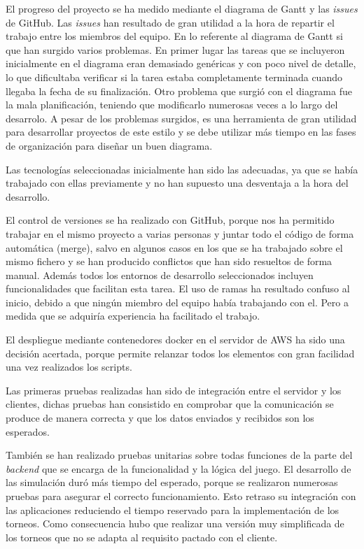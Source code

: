 \documentclass{article}
\begin{document}
El progreso del proyecto se ha medido mediante el diagrama de Gantt y las \textit{issues} de GitHub. Las \textit{issues} han resultado de gran utilidad a la hora de repartir el trabajo entre los miembros del equipo. En lo referente al diagrama de Gantt si que han surgido varios problemas. En primer lugar las tareas que se incluyeron inicialmente en el diagrama eran demasiado genéricas y con poco nivel de detalle, lo que dificultaba verificar si la tarea estaba completamente terminada cuando llegaba la fecha de su finalización. Otro problema que surgió con el diagrama fue la mala planificación, teniendo que modificarlo numerosas veces a lo largo del desarrolo. A pesar de los problemas surgidos, es una herramienta de gran utilidad para desarrollar proyectos de este estilo y se debe utilizar más tiempo en las fases de organización para diseñar un buen diagrama.

Las tecnologías seleccionadas inicialmente han sido las adecuadas, ya que se había trabajado con ellas previamente y no han supuesto una desventaja a la hora del desarrollo.

El control de versiones se ha realizado con GitHub, porque nos ha permitido trabajar en el mismo proyecto a varias personas y juntar todo el código de forma automática (merge), salvo en algunos casos en los que se ha trabajado sobre el mismo fichero y se han producido conflictos que han sido resueltos de forma manual. Además todos los entornos de desarrollo seleccionados incluyen funcionalidades que facilitan esta tarea. El uso de ramas ha resultado confuso al inicio, debido a que ningún miembro del equipo había trabajando con el. Pero a medida que se adquiría experiencia ha facilitado el trabajo.

El despliegue mediante contenedores docker en el servidor de AWS ha sido una decisión acertada, porque permite relanzar todos los elementos con gran facilidad una vez realizados los scripts.

Las primeras pruebas realizadas han sido de integración entre el servidor y los clientes, dichas pruebas han consistido en comprobar que la comunicación se produce de manera correcta y que los datos enviados y recibidos son los esperados.

También se han realizado pruebas unitarias sobre todas funciones de la parte del \textit{backend} que se encarga de la funcionalidad y la lógica del juego. El desarrollo de las simulación duró más tiempo del esperado, porque se realizaron numerosas pruebas para asegurar el correcto funcionamiento. Esto retraso su integración con las aplicaciones reduciendo el tiempo reservado para la implementación de los torneos. Como consecuencia hubo que realizar una versión muy simplificada de los torneos que no se adapta al requisito pactado con el cliente.
\end{document}
